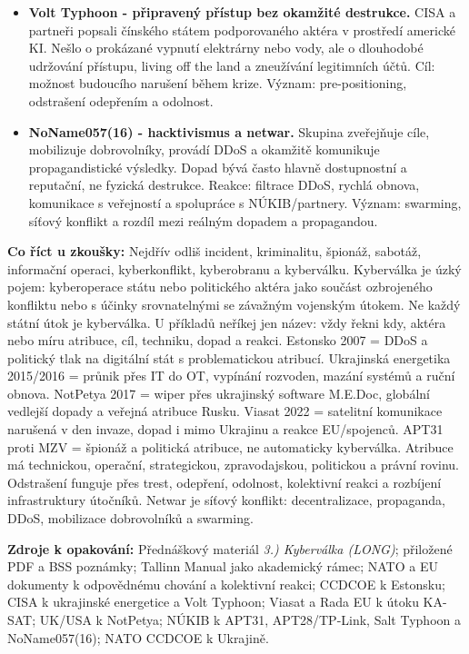\documentclass[11pt,a4paper]{article}
\newcommand{\zkouska}[1]{\begin{tcolorbox}[breakable,enhanced,colback=blue!7,colframe=blue!30!black,boxrule=0pt,arc=1mm,left=5pt,right=5pt,top=5pt,bottom=5pt,before skip=6pt,after skip=6pt]\textbf{Co říct u zkoušky:} #1\end{tcolorbox}}
\newcommand{\zdroje}[1]{\medskip\noindent\textbf{Zdroje k opakování:} #1\medskip}
\begin{document}
\begin{itemize}
  \item \textbf{Volt Typhoon - připravený přístup bez okamžité destrukce.} CISA a partneři popsali čínského státem podporovaného aktéra v prostředí americké KI. Nešlo o prokázané vypnutí elektrárny nebo vody, ale o dlouhodobé udržování přístupu, living off the land a zneužívání legitimních účtů. Cíl: možnost budoucího narušení během krize. Význam: pre-positioning, odstrašení odepřením a odolnost.
  \item \textbf{NoName057(16) - hacktivismus a netwar.} Skupina zveřejňuje cíle, mobilizuje dobrovolníky, provádí DDoS a okamžitě komunikuje propagandistické výsledky. Dopad bývá často hlavně dostupnostní a reputační, ne fyzická destrukce. Reakce: filtrace DDoS, rychlá obnova, komunikace s veřejností a spolupráce s NÚKIB/partnery. Význam: swarming, síťový konflikt a rozdíl mezi reálným dopadem a propagandou.
\end{itemize}

\zkouska{Nejdřív odliš incident, kriminalitu, špionáž, sabotáž, informační operaci, kyberkonflikt, kyberobranu a kyberválku. Kyberválka je úzký pojem: kyberoperace státu nebo politického aktéra jako součást ozbrojeného konfliktu nebo s účinky srovnatelnými se závažným vojenským útokem. Ne každý státní útok je kyberválka. U příkladů neříkej jen název: vždy řekni kdy, aktéra nebo míru atribuce, cíl, techniku, dopad a reakci. Estonsko 2007 = DDoS a politický tlak na digitální stát s problematickou atribucí. Ukrajinská energetika 2015/2016 = průnik přes IT do OT, vypínání rozvoden, mazání systémů a ruční obnova. NotPetya 2017 = wiper přes ukrajinský software M.E.Doc, globální vedlejší dopady a veřejná atribuce Rusku. Viasat 2022 = satelitní komunikace narušená v den invaze, dopad i mimo Ukrajinu a reakce EU/spojenců. APT31 proti MZV = špionáž a politická atribuce, ne automaticky kyberválka. Atribuce má technickou, operační, strategickou, zpravodajskou, politickou a právní rovinu. Odstrašení funguje přes trest, odepření, odolnost, kolektivní reakci a rozbíjení infrastruktury útočníků. Netwar je síťový konflikt: decentralizace, propaganda, DDoS, mobilizace dobrovolníků a swarming.}

\zdroje{Přednáškový materiál \emph{3.) Kyberválka (LONG)}; přiložené PDF a BSS poznámky; Tallinn Manual jako akademický rámec; NATO a EU dokumenty k odpovědnému chování a kolektivní reakci; CCDCOE k Estonsku; CISA k ukrajinské energetice a Volt Typhoon; Viasat a Rada EU k útoku KA-SAT; UK/USA k NotPetya; NÚKIB k APT31, APT28/TP-Link, Salt Typhoon a NoName057(16); NATO CCDCOE k Ukrajině.}
\end{document}
